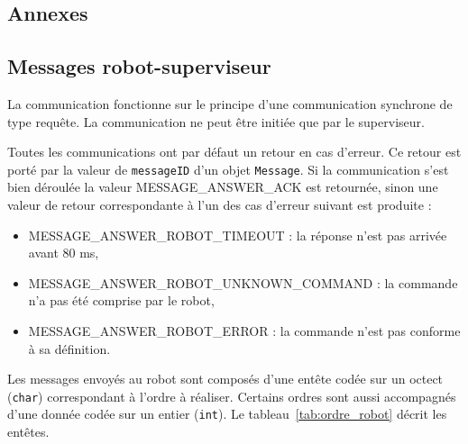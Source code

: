 \begin{appendices}
\section{Annexes}

\subsection{Messages robot-superviseur}
\label{sec:sec:comm_rob_sup}

La communication fonctionne sur le principe d'une communication synchrone de type requête. La communication ne peut être initiée que par le superviseur.

Toutes les communications ont par défaut un retour en cas d'erreur. Ce retour est porté par la valeur de {\tt messageID} d'un objet {\tt Message}. Si la communication s'est bien déroulée la valeur MESSAGE\_ANSWER\_ACK est retournée, sinon une valeur de retour correspondante à l'un des cas d'erreur suivant est produite : 
\begin{itemize}
	\item MESSAGE\_ANSWER\_ROBOT\_TIMEOUT : la réponse n'est pas arrivée avant 80 ms,
	\item MESSAGE\_ANSWER\_ROBOT\_UNKNOWN\_COMMAND : la commande n'a pas été comprise par le robot,
	\item MESSAGE\_ANSWER\_ROBOT\_ERROR : la commande n'est pas conforme à sa définition.
\end{itemize}
\FloatBarrier

Les messages envoyés au robot sont composés d'une entête codée sur un octect ({\tt char}) correspondant à l'ordre à réaliser. Certains ordres sont aussi accompagnés d'une donnée codée sur un entier ({\tt int}). Le tableau~\ref{tab:ordre_robot} décrit les entêtes.


\end{appendices}
